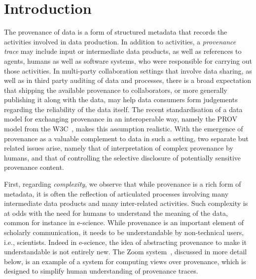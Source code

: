 \section{Introduction}

The provenance of data is a form of structured metadata that records the activities involved in data production. In addition to activities, a \textit{provenance trace} may include input  or intermediate data products, as well as references to agents, humans as well as software systems, who were responsible for carrying out those activities.
%
In multi-party collaboration settings that involve data sharing, as well as in third party auditing of data and processes, there is a broad expectation that 
shipping the available provenance to collaborators, or more generally publishing it along with the data, may help data consumers form judgements regarding the reliability of the data itself.
%
%
The recent standardisation of a data model for exchanging provenance in an interoperable way, namely the PROV model from the W3C~\citep{w3c-prov-dm}, makes this assumption realistic.
%
With the emergence of provenance as a valuable complement to data in such a setting, two separate but related issues arise, namely that of interpretation of complex provenance by humans,  and that of controlling the selective disclosure of potentially sensitive provenance content.
  
%
First, regarding \textit{complexity}, we observe that while provenance is a rich form of metadata, it is often the reflection of articulated processes involving many intermediate data products and many inter-related activities. 
%
Such complexity is at odds with the need for humans to understand the meaning of the data, common for instance in e-science. 
While provenance is an important element of scholarly communication, it needs to be understandable by non-technical users, i.e., scientists. 
%
Indeed in e-science, the idea of abstracting provenance to make it understandable is not entirely new.
%
The Zoom system~\citep{DBLP:conf/icde/BitonBDH08}, discussed in more detail below, is an example of a system for computing views over provenance, which is designed to simplify human understanding of provenance traces.
%

